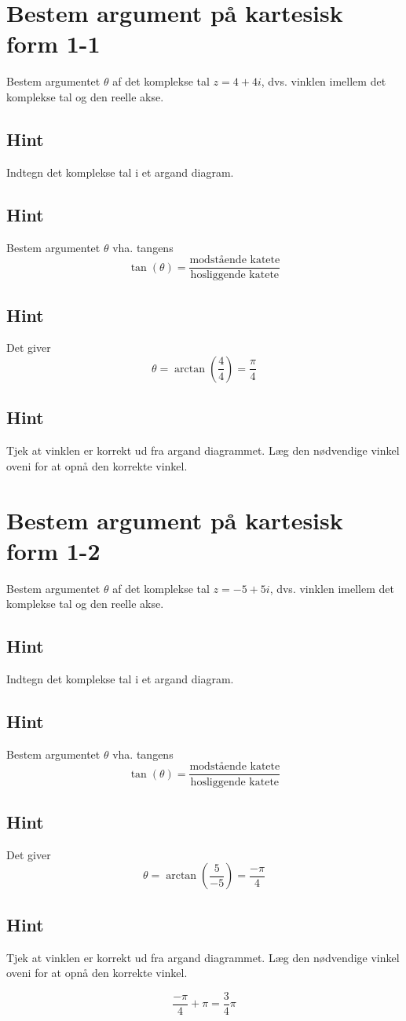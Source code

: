 \documentclass{article}
\newenvironment{exercise}[1]{\newpage\section{#1}}{}
\newcommand{\answerbox}[1]{\fbox{$#1$}}
\newcommand{\hint}{\subsection*{Hint}}
\begin{document}
\tableofcontents
\newpage

\begin{exercise}{Bestem argument på kartesisk form 1-1}

Bestem argumentet $\theta$ af det komplekse tal $z=4+4i$, dvs. vinklen imellem det komplekse tal og den reelle akse.

\answerbox{\frac{\pi}{4}}


\hint 

Indtegn det komplekse tal i et argand diagram.


\hint

Bestem argumentet $\theta$ vha. tangens
\[
\tan(\theta)=\frac{\textrm{modstående katete}}{\textrm{hosliggende katete}}
\]

\hint 

Det giver
\[
\theta = \arctan \left(\frac{4}{4}\right) = \frac{\pi}{4}
\]

\hint

Tjek at vinklen er korrekt ud fra argand diagrammet. Læg den nødvendige vinkel oveni for at opnå den korrekte vinkel. 


\end{exercise}

\newpage

\begin{exercise}{Bestem argument på kartesisk form 1-2}
	
	Bestem argumentet $\theta$ af det komplekse tal $z=-5+5i$, dvs. vinklen imellem det komplekse tal og den reelle akse.
	
	\answerbox{\frac{3}{4} \pi}
	
	
	\hint 
	
	Indtegn det komplekse tal i et argand diagram.
	
	
	\hint
	
	Bestem argumentet $\theta$ vha. tangens
	\[
	\tan(\theta)=\frac{\textrm{modstående katete}}{\textrm{hosliggende katete}}
	\]
	
	\hint 
	
	Det giver
	\[
	\theta = \arctan \left(\frac{5}{-5}\right) = \frac{-\pi}{4}
	\]
	
	\hint
	
	Tjek at vinklen er korrekt ud fra argand diagrammet. Læg den nødvendige vinkel oveni for at opnå den korrekte vinkel. 
	
	\[
	\frac{-\pi}{4} + \pi = \frac{3}{4} \pi
	\]
	
\end{exercise}

\newpage
\end{document}
